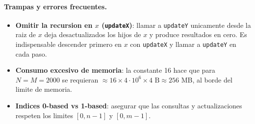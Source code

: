 \paragraph{Trampas y errores frecuentes.}
\begin{itemize}\setlength\itemsep{0pt}
	\item \textbf{Omitir la recursion en $x$ (\texttt{updateX})}: llamar a \texttt{updateY} unicamente desde la raiz de $x$ deja desactualizados los hijos de $x$ y produce resultados en cero. Es indispensable descender primero en $x$ con \texttt{updateX} y llamar a \texttt{updateY} en cada paso.
	\item \textbf{Consumo excesivo de memoria}: la constante 16 hace que para $N = M = 2000$ se requieran $\approx 16 \times 4 \cdot 10^6 \times 4\text{ B} \approx 256$ MB, al borde del limite de memoria.
	\item \textbf{Indices 0-based vs 1-based}: asegurar que las consultas y actualizaciones respeten los limites $[0, n-1]$ y $[0, m-1]$.
\end{itemize}

